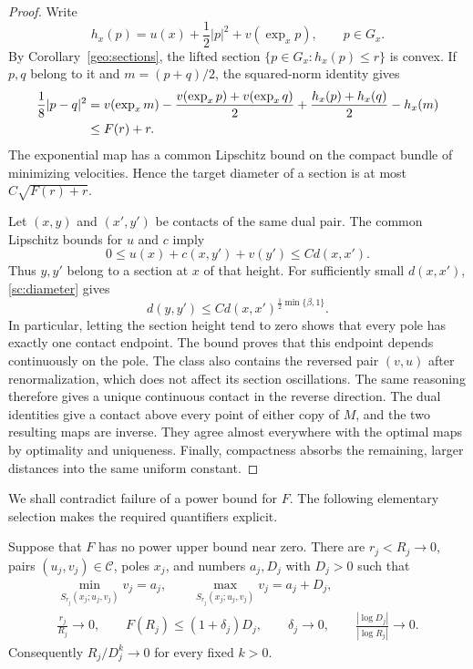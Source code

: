 \begin{proof}
Write
\[
 h_x(p)=u(x)+\frac12|p|^2+v(\exp_xp),\qquad p\in G_x.
\]
By Corollary~\ref{geo:sections}, the lifted section
$\{p\in G_x:h_x(p)\leq r\}$ is convex.
If $p,q$ belong to it and $m=(p+q)/2$, the squared-norm identity gives
\begin{align}
 \frac18|p-q|^2
 &=v(\exp_xm)-\frac{v(\exp_xp)+v(\exp_xq)}2
   +\frac{h_x(p)+h_x(q)}2-h_x(m) \notag\\
 &\leq F(r)+r.                                      \label{sc:diameter}
\end{align}
The exponential map has a common Lipschitz bound on the compact bundle
of minimizing velocities.  Hence the target diameter of a section is
at most $C\sqrt{F(r)+r}$.

Let $(x,y)$ and $(x',y')$ be contacts of the same dual pair.  The common
Lipschitz bounds for $u$ and $c$ imply
\[
 0\leq u(x)+c(x,y')+v(y')\leq C d(x,x').
\]
Thus $y,y'$ belong to a section at $x$ of that height.  For sufficiently
small $d(x,x')$, \eqref{sc:diameter} gives
\[
 d(y,y')\leq C d(x,x')^{\frac12\min\{\beta,1\}}.
\]
In particular, letting the section height tend to zero shows that
every pole has exactly one contact endpoint.  The bound proves that
this endpoint depends continuously on the pole. The class also contains
the reversed pair $(v,u)$ after renormalization, which does not affect
its section oscillations. The same reasoning therefore gives a unique
continuous contact in the reverse direction. The dual identities give a contact above every point
of either copy of $M$, and the two resulting maps are inverse.
They agree almost everywhere with the optimal maps by optimality and
uniqueness.  Finally, compactness absorbs the remaining, larger
distances into the same uniform constant.
\end{proof}

We shall contradict failure of a power bound for $F$.
The following elementary selection makes the required quantifiers
explicit.

\begin{lemma}\label{sc:plateau}
Suppose that $F$ has no power upper bound near zero.
There are $r_j<R_j\to0$, pairs $(u_j,v_j)\in\mathcal C$, poles $x_j$,
and numbers $a_j,D_j$ with $D_j>0$ such that
\begin{gather}
 \min_{S_{r_j}(x_j;u_j,v_j)}v_j=a_j,\qquad
 \max_{S_{r_j}(x_j;u_j,v_j)}v_j=a_j+D_j,               \label{sc:endlevels}\\
 \frac{r_j}{R_j}\longrightarrow0,\qquad
 F(R_j)\leq(1+\delta_j)D_j,\qquad \delta_j\longrightarrow0,\qquad
 \frac{|\log D_j|}{|\log R_j|}\longrightarrow0.       \label{sc:plateau-data}
\end{gather}
Consequently $R_j/D_j^k\to0$ for every fixed $k>0$.
\end{lemma}

